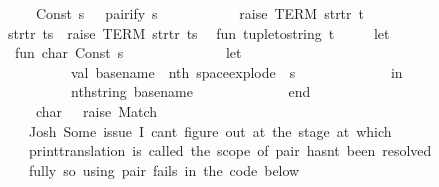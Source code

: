 \begin{isabellebody}
\ \ \ \ \ \ \ \ {\isacharbar}{\kern0pt}\ Const\ {\isacharparenleft}{\kern0pt}s{\isacharcomma}{\kern0pt}\ {\isacharunderscore}{\kern0pt}{\isacharparenright}{\kern0pt}\ {\isacharequal}{\kern0pt}{\isachargreater}{\kern0pt}\ pairify\ s\isanewline
\ \ \ \ \ \ \ \ {\isacharbar}{\kern0pt}\ {\isacharunderscore}{\kern0pt}\ {\isacharequal}{\kern0pt}{\isachargreater}{\kern0pt}\ raise\ TERM\ {\isacharparenleft}{\kern0pt}{\isachardoublequote}{\kern0pt}str{\isacharunderscore}{\kern0pt}tr{\isachardoublequote}{\kern0pt}{\isacharcomma}{\kern0pt}\ {\isacharbrackleft}{\kern0pt}t{\isacharbrackright}{\kern0pt}{\isacharparenright}{\kern0pt}{\isacharparenright}{\kern0pt}\isanewline
\ \ \ \ {\isacharbar}{\kern0pt}\ str{\isacharunderscore}{\kern0pt}tr\ ts\ {\isacharequal}{\kern0pt}\ raise\ TERM\ {\isacharparenleft}{\kern0pt}{\isachardoublequote}{\kern0pt}str{\isacharunderscore}{\kern0pt}tr{\isachardoublequote}{\kern0pt}{\isacharcomma}{\kern0pt}\ ts{\isacharparenright}{\kern0pt}\isanewline
\isanewline
\ \ fun\ tuple{\isacharunderscore}{\kern0pt}to{\isacharunderscore}{\kern0pt}string\ t\ {\isacharequal}{\kern0pt}\isanewline
\ \ \ \ let\isanewline
\ \ \ \ \ \ fun\ char\ {\isacharparenleft}{\kern0pt}Const\ {\isacharparenleft}{\kern0pt}s{\isacharcomma}{\kern0pt}\ {\isacharunderscore}{\kern0pt}{\isacharparenright}{\kern0pt}{\isacharparenright}{\kern0pt}\ {\isacharequal}{\kern0pt}\isanewline
\ \ \ \ \ \ \ \ \ \ \ \ let\isanewline
\ \ \ \ \ \ \ \ \ \ \ \ \ \ val\ base{\isacharunderscore}{\kern0pt}name\ {\isacharequal}{\kern0pt}\ nth\ {\isacharparenleft}{\kern0pt}space{\isacharunderscore}{\kern0pt}explode\ {\isachardoublequote}{\kern0pt}{\isachardot}{\kern0pt}{\isachardoublequote}{\kern0pt}\ s{\isacharparenright}{\kern0pt}\ {}\isanewline
\ \ \ \ \ \ \ \ \ \ \ \ in\isanewline
\ \ \ \ \ \ \ \ \ \ \ \ \ \ nth{\isacharunderscore}{\kern0pt}string\ base{\isacharunderscore}{\kern0pt}name\ {}\isanewline
\ \ \ \ \ \ \ \ \ \ \ \ end\isanewline
\ \ \ \ \ \ \ \ {\isacharbar}{\kern0pt}\ char\ {\isacharunderscore}{\kern0pt}\ {\isacharequal}{\kern0pt}\ raise\ Match\isanewline
\isanewline
\ \ \ \ \ \ {\isacharparenleft}{\kern0pt}{\isacharasterisk}{\kern0pt}\isanewline
\ \ \ \ \ \ \ \ Josh{\isacharcolon}{\kern0pt}\ Some\ issue\ I\ can{\isacharprime}{\kern0pt}t\ figure\ out{\isacharcolon}{\kern0pt}\ at\ the\ stage\ at\ which\isanewline
\ \ \ \ \ \ \ \ print{\isacharunderscore}{\kern0pt}translation\ is\ called{\isacharcomma}{\kern0pt}\ the\ scope\ of\ {\isasymopen}pair{\isasymclose}\ hasn{\isacharprime}{\kern0pt}t\ been\ resolved\isanewline
\ \ \ \ \ \ \ \ fully{\isacharcomma}{\kern0pt}\ so\ using\ \isactrlconstUNDERSCOREname {\isasymopen}pair{\isasymclose}\ fails\ in\ the\ code\ below{\isachardot}{\kern0pt}\isanewline

\end{isabellebody}
